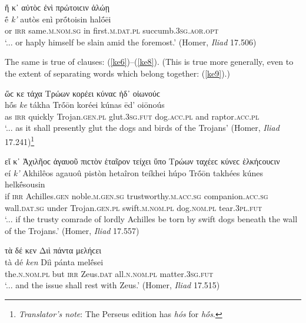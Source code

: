 \begin{exe}
\ex ἤ κ᾽ αὐτὸϲ ἐνὶ πρώτοιϲιν ἁλώῃ\\
\gll ḗ \emph{k'} autòs enì prṓtoisin halṓēi\\
or \textsc{irr} same.\textsc{m.nom.sg} in first.\textsc{m.dat.pl} succumb.\textsc{3sg.aor.opt}\\
\trans `... or haply himself be slain amid the foremost.' (Homer, \textit{Iliad} 17.506)
\label{ke5}
\end{exe}

The same is true of  clauses: (\ref{ke6})--(\ref{ke8}). (This is true more generally, even to the extent of separating words which belong together: (\ref{ke9}).)

\begin{exe}
\ex ὥϲ κε τάχα Τρώων κορέει κύναϲ ἠδ᾽ οἰωνούϲ\\
\gll hṓs \emph{ke} tákha Trṓōn koréei kúnas ēd' oiōnoús\\
as \textsc{irr} quickly Trojan.\textsc{gen.pl} glut.\textsc{3sg.fut} dog.\textsc{acc.pl} and raptor.\textsc{acc.pl}\\
\trans `... as it shall presently glut the dogs and birds of the Trojans' (Homer, \textit{Iliad} 17.241)\footnote{\emph{Translator's note}: The Perseus edition has \textit{hós} for \textit{hṓs}.}
\label{ke6}
\end{exe}

\begin{exe}
\ex εἴ κ᾽ Ἀχιλῆοϲ ἀγαυοῦ πιϲτὸν ἑταῖρον τείχει ὕπο Τρώων ταχέεϲ κύνεϲ ἑλκήϲουϲιν\\
\gll eí \emph{k'} Akhilêos agauoû pistòn hetaîron teíkhei húpo Trṓōn takhées kúnes helkḗsousin\\
if \textsc{irr} Achilles.\textsc{gen} noble.\textsc{m.gen.sg} trustworthy.\textsc{m.acc.sg} companion.\textsc{acc.sg} wall.\textsc{dat.sg} under Trojan.\textsc{gen.pl} swift.\textsc{m.nom.pl} dog.\textsc{nom.pl} tear.\textsc{3pl.fut}\\
\trans `... if the trusty comrade of lordly Achilles be torn by swift dogs beneath the wall of the Trojans.' (Homer, \textit{Iliad} 17.557)
\label{ke7}
\end{exe}

\begin{exe}
\ex τὰ δέ κεν Διὶ πάντα μελήϲει\\
\gll tà dé \emph{ken} Diì pánta melḗsei\\
the.\textsc{n.nom.pl} but \textsc{irr} Zeus.\textsc{dat} all.\textsc{n.nom.pl} matter.\textsc{3sg.fut}\\
\trans `... and the issue shall rest with Zeus.' (Homer, \textit{Iliad} 17.515)
\label{ke8}
\end{exe}

